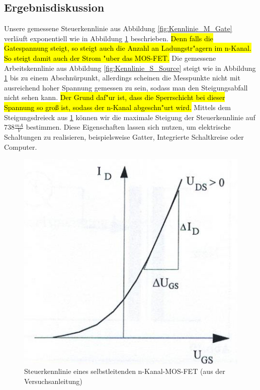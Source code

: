 \documentclass{scrartcl}
\begin{document}
\subsection{Ergebnisdiskussion}
Unsere gemessene Steuerkennlinie aus Abbildung \ref{fig:Kennlinie_M_Gate} verläuft exponentiell wie in Abbildung \ref{fig:Kennlinie_Gate} beschrieben. 
\hl{Denn falls die Gatespannung steigt, so steigt auch die Anzahl an Ladungstr"agern im n-Kanal. So steigt damit auch der Strom "uber das MOS-FET.} Die gemessene Arbeitskennlinie aus Abbildung \ref{fig:Kennlinie_S_Source} steigt wie in Abbildung \ref{fig:Kennlinie_Gate} bis zu einem Abschnürpunkt, allerdings scheinen die Messpunkte nicht mit ausreichend hoher Spannung gemessen zu sein, sodass man den Steigungsabfall nicht sehen kann.
\hl{Der Grund daf"ur ist, dass die Sperrschicht bei dieser Spannung so gro\ss{} ist, sodass der n-Kanal abgeschn"urt wird.}
Mittels dem Steigungsdreieck aus \ref{fig:Kennlinie_Gate} können wir die maximale Steigung der Steuerkennlinie auf $738\frac{mA}{V}$ bestimmen. Diese Eigenschaften lassen sich nutzen, um elektrische Schaltungen zu realisieren, beispielsweise Gatter, Integrierte Schaltkreise oder Computer. 
\begin{figure}[H]
  \centering
    \includegraphics[scale=0.75]{Kennlinie_Gate.JPG}
  \caption{Steuerkennlinie eines selbstleitenden n-Kanal-MOS-FET (aus der Versuchsanleitung)}
  \label{fig:Kennlinie_Gate}
\end{figure}
\end{document}
